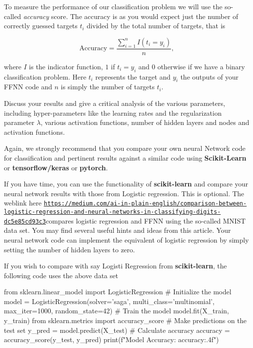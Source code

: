 \documentclass[%
oneside,                 %
final,                   %
10pt]{article}
\begin{document}
\epycod


To measure the performance of our classification problem we will use the
so-called \emph{accuracy} score.  The accuracy is as you would expect just
the number of correctly guessed targets $t_i$ divided by the total
number of targets, that is 

\[ 
\text{Accuracy} = \frac{\sum_{i=1}^n I(t_i = y_i)}{n} ,
\]

where $I$ is the indicator function, $1$ if $t_i = y_i$ and $0$
otherwise if we have a binary classification problem. Here $t_i$
represents the target and $y_i$ the outputs of your FFNN code and $n$ is simply the number of targets $t_i$.

Discuss your results and give a critical analysis of the various parameters, including hyper-parameters like the learning rates and the regularization parameter $\lambda$, various activation functions, number of hidden layers and nodes and activation functions.  

Again, we strongly recommend that you compare your own neural Network
code for classification and pertinent results against a similar code using \textbf{Scikit-Learn}  or \textbf{tensorflow/keras} or \textbf{pytorch}.

If you have time, you can use the functionality of \textbf{scikit-learn} and compare your neural network results with those from Logistic regression. This is optional.
The weblink  here \href{{https://medium.com/ai-in-plain-english/comparison-between-logistic-regression-and-neural-networks-in-classifying-digits-dc5e85cd93c3}}{\nolinkurl{https://medium.com/ai-in-plain-english/comparison-between-logistic-regression-and-neural-networks-in-classifying-digits-dc5e85cd93c3}}compares logistic regression and FFNN using the so-called MNIST data set. You may find several useful hints and ideas from this article. Your neural network code can implement the equivalent of logistic regression by simply setting the number of hidden layers to zero. 

If you wish to compare with say Logisti Regression from \textbf{scikit-learn}, the following code uses the above data set












\bpycod
from sklearn.linear_model import LogisticRegression
# Initialize the model
model = LogisticRegression(solver='saga', multi_class='multinomial', max_iter=1000, random_state=42)
# Train the model
model.fit(X_train, y_train)
from sklearn.metrics import accuracy_score
# Make predictions on the test set
y_pred = model.predict(X_test)
# Calculate accuracy
accuracy = accuracy_score(y_test, y_pred)
print(f"Model Accuracy: {accuracy:.4f}")
\end{document}
